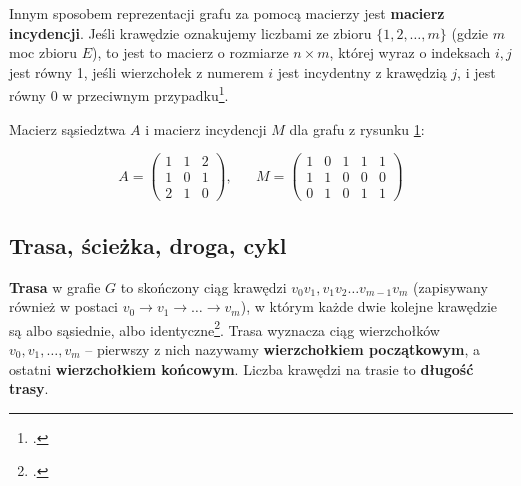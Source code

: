 Innym sposobem reprezentacji grafu za pomocą macierzy jest \textbf{macierz incydencji}. Jeśli krawędzie oznakujemy liczbami ze zbioru $\{1,2,\ldots,m\}$ (gdzie $m$ moc zbioru $E$), to jest to macierz o rozmiarze $n \times m$, której wyraz o indeksach $i,j$ jest równy 1, jeśli wierzchołek z numerem $i$ jest incydentny z krawędzią $j$, i jest równy 0 w przeciwnym przypadku\footcite[27]{ross}.

\begin{figure}[H]
\centering
\caption{}\label{fig:graph-edge-labeled}
\end{figure}

Macierz sąsiedztwa $A$ i macierz incydencji $M$ dla grafu z rysunku \ref{fig:graph-edge-labeled}:

\[A = 
 \begin{pmatrix}
  1 & 1 & 2 \\
  1 & 0 & 1 \\
  2 & 1 & 0 
 \end{pmatrix}, \hspace{20pt}
 M = 
 \begin{pmatrix}
  1 & 0 & 1 & 1 & 1 \\
  1 & 1 & 0 & 0 & 0 \\
  0 & 1 & 0 & 1 & 1 
 \end{pmatrix}
\]

\subsection*{Trasa, ścieżka, droga, cykl}

\textbf{Trasa} w grafie $G$ to skończony ciąg krawędzi $v_0v_1,v_1v_2\ldots v_{m-1}v_m$ (zapisywany również w postaci $v_0 \rightarrow v_1 \rightarrow \ldots \rightarrow v_m$), w którym każde dwie kolejne krawędzie są albo sąsiednie, albo identyczne\footcite[41]{wilson}. Trasa wyznacza ciąg wierzchołków $v_0,v_1,\ldots,v_m$ -- pierwszy z nich nazywamy \textbf{wierzchołkiem początkowym}, a ostatni \textbf{wierzchołkiem końcowym}. Liczba krawędzi na trasie to \textbf{długość trasy}. 

